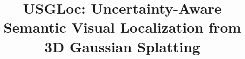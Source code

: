 \documentclass[journal]{IEEEtran}
\newcommand{\method}{USGLoc}
\begin{document}
\title{\method{}: Uncertainty-Aware Semantic Visual Localization from 3D Gaussian Splatting}

\maketitle
\end{document}
